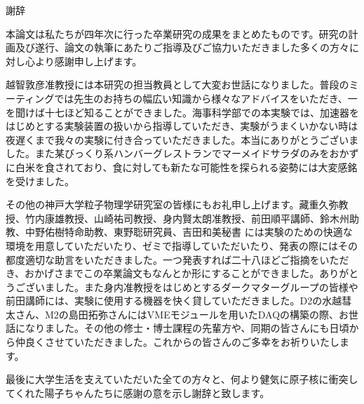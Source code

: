 \documentclass[a4paper,11pt,dvipdfmx]{jsarticle}
\begin{document}
\newpage
{}
{\LARGE 謝辞}\\

本論文は私たちが四年次に行った卒業研究の成果をまとめたものです。研究の計画及び遂行、論文の執筆にあたりご指導及びご協力いただきました多くの方々に対し心より感謝申し上げます。

越智敦彦准教授には本研究の担当教員として大変お世話になりました。普段のミーティングでは先生のお持ちの幅広い知識から様々なアドバイスをいただき、一を聞けば十七ほど知ることができました。海事科学部での本実験では、加速器をはじめとする実験装置の扱いから指導していただき、実験がうまくいかない時は夜遅くまで我々の実験に付き合っていただきました。本当にありがとうございました。また某びっくり系ハンバーグレストランでマーメイドサラダのみをおかずに白米を食されており、食に対しても新たな可能性を探られる姿勢には大変感銘を受けました。

その他の神戸大学粒子物理学研究室の皆様にもお礼申し上げます。藏重久弥教授、竹内康雄教授、山崎祐司教授、身内賢太朗准教授、前田順平講師、鈴木州助教、中野佑樹特命助教、東野聡研究員、吉田和美秘書 には実験のための快適な環境を用意していただいたり、ゼミで指導していただいたり、発表の際にはその都度適切な助言をいただきました。一つ発表すれば二十八ほどご指摘をいただき、おかげさまでこの卒業論文もなんとか形にすることができました。ありがとうございました。また身内准教授をはじめとするダークマターグループの皆様や前田講師には、実験に使用する機器を快く貸していただきました。D2の水越彗太さん、M2の島田拓弥さんにはVMEモジュールを用いたDAQの構築の際、お世話になりました。その他の修士・博士課程の先輩方や、同期の皆さんにも日頃から仲良くさせていただきました。これからの皆さんのご多幸をお祈りいたします。

最後に大学生活を支えていただいた全ての方々と、何より健気に原子核に衝突してくれた陽子ちゃんたちに感謝の意を示し謝辞と致します。
\end{document}
